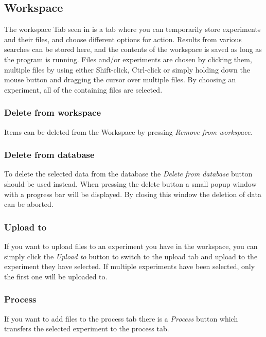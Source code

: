 \FloatBarrier

\subsection{Workspace} \label{sec:des_workspace}
The workspace Tab seen in  is a tab where you can temporarily store experiments and their files, and choose different options for action. Results from various searches can be stored here, and the contents of the workspace is saved as long as the program is running. Files and/or experiments are chosen by clicking them, multiple files by using either Shift-click, Ctrl-click or simply holding down the mouse button and dragging the cursor over multiple files. By choosing an experiment, all of the containing files are selected.
\subsubsection{Delete from workspace}
Items can be deleted from the Workspace by pressing \textit{Remove from workspace}.
\subsubsection{Delete from database}
To delete the selected data from the database the \textit{Delete from database} button should be used instead. When pressing the delete button a small popup window with a progress bar will be displayed. By closing this window the deletion of data can be aborted.
\subsubsection{Upload to}
If you want to upload files to an experiment you have in the workspace, you can simply click the \textit{Upload to} button to switch to the upload tab and upload to the experiment they have selected. If multiple experiments have been selected, only the first one will be uploaded to.
\subsubsection{Process}
If you want to add files to the process tab there is a \textit{Process} button which transfers the selected experiment to the process tab.
